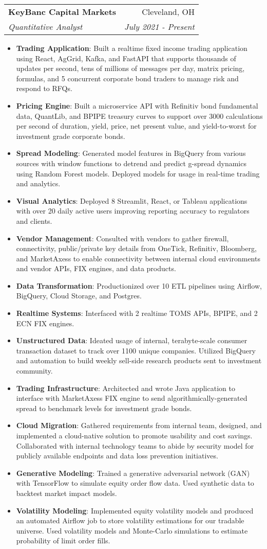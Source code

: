 \documentclass[letterpaper,11pt]{article}
\makeatletter
\newcommand{\resumeItem}[2]{
  \item\small{
    \textbf{#1}{: #2 \vspace{-2pt}}
  }
}
\newcommand{\resumeSubheading}[4]{
  \vspace{-1pt}\item
    \begin{tabular*}{0.97\textwidth}[t]{l@{\extracolsep{\fill}}r}
      \textbf{#1} & #2 \\
      \textit{\small#3} & \textit{\small #4} \\
    \end{tabular*}\vspace{-5pt}
}
\newcommand{\resumeItemListStart}{\begin{itemize}}
\newcommand{\resumeItemListEnd}{\end{itemize}\vspace{-5pt}}
\makeatother
\begin{document}
    \resumeSubheading
      {KeyBanc Capital Markets}{Cleveland, OH}
      {Quantitative Analyst}{July 2021 - Present}
      \resumeItemListStart
        \resumeItem{Trading Application}
            {Built a realtime fixed income trading application using React, AgGrid, Kafka, and FastAPI that supports thousands of updates per second, tens of millions of messages per day, matrix pricing, formulas, and 5 concurrent corporate bond traders to manage risk and respond to RFQs.}
        \resumeItem{Pricing Engine}
            {Built a microservice API with Refinitiv bond fundamental data, QuantLib, and BPIPE treasury curves to support over 3000 calculations per second of duration, yield, price, net present value, and yield-to-worst for investment grade corporate bonds.}
        \resumeItem{Spread Modeling}
            {Generated model features in BigQuery from various sources with window functions to detrend and predict g-spread dynamics using Random Forest models. Deployed models for usage in real-time trading and analytics.}
        \resumeItem{Visual Analytics}
            {Deployed 8 Streamlit, React, or Tableau applications with over 20 daily active users improving reporting accuracy to regulators and clients.}
        \resumeItem{Vendor Management}
          {Consulted with vendors to gather firewall, connectivity, public/private key details from OneTick, Refinitiv, Bloomberg, and MarketAxess to enable connectivity between internal cloud environments and vendor APIs, FIX engines, and data products.}
        \resumeItem{Data Transformation}
            {Productionized over 10 ETL pipelines using Airflow, BigQuery, Cloud Storage, and Postgres.}
        \resumeItem{Realtime Systems}
          {Interfaced with 2 realtime TOMS APIs, BPIPE, and 2 ECN FIX engines.}
        \resumeItem{Unstructured Data}
          {Ideated usage of internal, terabyte-scale consumer transaction dataset to track over 1100 unique companies. Utilized BigQuery and automation to build weekly sell-side research products sent to investment community.}
        \resumeItem{Trading Infrastructure}
          {Architected and wrote Java application to interface with MarketAxess FIX engine to send algorithmically-generated spread to benchmark levels for investment grade bonds.}
        \resumeItem{Cloud Migration}
            {Gathered requirements from internal team, designed, and implemented a cloud-native solution to promote usability and cost savings. Collaborated with internal technology teams to abide by security model for publicly available endpoints and data loss prevention initiatives.}
        \resumeItem{Generative Modeling}
            {Trained a generative adversarial network (GAN) with TensorFlow to simulate equity order flow data. Used synthetic data to backtest market impact models.}
        \resumeItem{Volatility Modeling}
            {Implemented equity volatility models and produced an automated Airflow job to store volatility estimations for our tradable universe. Used volatility models and Monte-Carlo simulations to estimate probability of limit order fills.}
      \resumeItemListEnd
\end{document}
